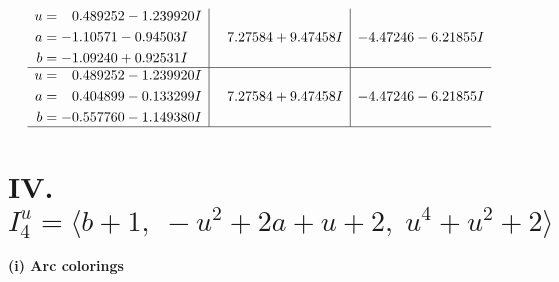 \documentclass[1p]{elsarticle_modified}
\theoremstyle{definition}
\begin{document}
$$\begin{array}{c|c|c}
\begin{aligned}
u &= \phantom{-}0.489252 - 1.239920 I \\
a &= -1.10571 - 0.94503 I \\
b &= -1.09240 + 0.92531 I\end{aligned}
 & \phantom{-}7.27584 + 9.47458 I & -4.47246 - 6.21855 I \\ \hline\begin{aligned}
u &= \phantom{-}0.489252 - 1.239920 I \\
a &= \phantom{-}0.404899 - 0.133299 I \\
b &= -0.557760 - 1.149380 I\end{aligned}
 & \phantom{-}7.27584 + 9.47458 I & -4.47246 - 6.21855 I\\
 \hline 
 \end{array}$$\newpage\newpage\renewcommand{\arraystretch}{1}
\centering \section*{IV. $I^u_{4}= \langle b+1,\;- u^2+2 a+u+2,\;u^4+u^2+2 \rangle$}
\flushleft \textbf{(i) Arc colorings}\\
\end{document}
